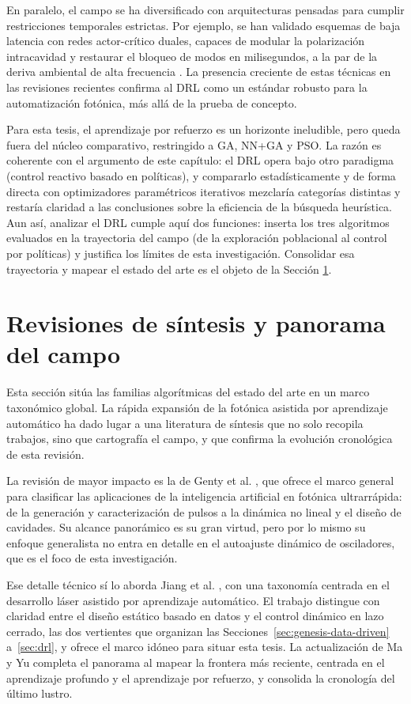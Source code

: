 En paralelo, el campo se ha diversificado con arquitecturas pensadas para cumplir restricciones temporales estrictas. Por ejemplo, se han validado esquemas de baja latencia con redes actor-crítico duales, capaces de modular la polarización intracavidad y restaurar el bloqueo de modos en milisegundos, a la par de la deriva ambiental de alta frecuencia \cite{Yan2021}. La presencia creciente de estas técnicas en las revisiones recientes confirma al DRL como un estándar robusto para la automatización fotónica, más allá de la prueba de concepto.

Para esta tesis, el aprendizaje por refuerzo es un horizonte ineludible, pero queda fuera del núcleo comparativo, restringido a GA, NN+GA y PSO. La razón es coherente con el argumento de este capítulo: el DRL opera bajo otro paradigma (control reactivo basado en políticas), y compararlo estadísticamente y de forma directa con optimizadores paramétricos iterativos mezclaría categorías distintas y restaría claridad a las conclusiones sobre la eficiencia de la búsqueda heurística. Aun así, analizar el DRL cumple aquí dos funciones: inserta los tres algoritmos evaluados en la trayectoria del campo (de la exploración poblacional al control por políticas) y justifica los límites de esta investigación. Consolidar esa trayectoria y mapear el estado del arte es el objeto de la Sección \ref{sec:revisiones}.


\section{Revisiones de síntesis y panorama del campo}
\label{sec:revisiones}
Esta sección sitúa las familias algorítmicas del estado del arte en un marco taxonómico global. La rápida expansión de la fotónica asistida por aprendizaje automático ha dado lugar a una literatura de síntesis que no solo recopila trabajos, sino que cartografía el campo, y que confirma la evolución cronológica de esta revisión.

La revisión de mayor impacto es la de Genty et al. \cite{Genty2021}, que ofrece el marco general para clasificar las aplicaciones de la inteligencia artificial en fotónica ultrarrápida: de la generación y caracterización de pulsos a la dinámica no lineal y el diseño de cavidades. Su alcance panorámico es su gran virtud, pero por lo mismo su enfoque generalista no entra en detalle en el autoajuste dinámico de osciladores, que es el foco de esta investigación.

Ese detalle técnico sí lo aborda Jiang et al. \cite{Jiang2022}, con una taxonomía centrada en el desarrollo láser asistido por aprendizaje automático. El trabajo distingue con claridad entre el diseño estático basado en datos y el control dinámico en lazo cerrado, las dos vertientes que organizan las Secciones~\ref{sec:genesis-data-driven} a~\ref{sec:drl}, y ofrece el marco idóneo para situar esta tesis. La actualización de Ma y Yu \cite{MaYu2023} completa el panorama al mapear la frontera más reciente, centrada en el aprendizaje profundo y el aprendizaje por refuerzo, y consolida la cronología del último lustro.

